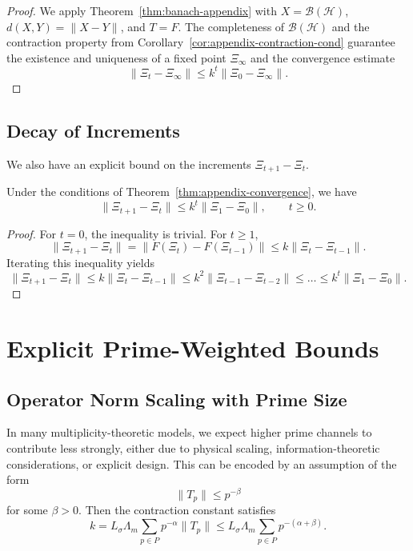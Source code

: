 \documentclass[12pt]{article}
\begin{document}
\begin{proof}
We apply Theorem~\ref{thm:banach-appendix} with \(X=\mathcal{B}(\mathcal{H})\), \(d(X,Y)=\|X-Y\|\), and \(T=F\). The completeness of \(\mathcal{B}(\mathcal{H})\) and the contraction property from Corollary~\ref{cor:appendix-contraction-cond} guarantee the existence and uniqueness of a fixed point \(\Xi_\infty\) and the convergence estimate
\[
  \|\Xi_t - \Xi_\infty\| \le k^t \|\Xi_0-\Xi_\infty\|.
\]
\end{proof}

\subsection{Decay of Increments}

We also have an explicit bound on the increments \(\Xi_{t+1}-\Xi_t\).

\begin{proposition}
\label{prop:appendix-increments}
Under the conditions of Theorem~\ref{thm:appendix-convergence}, we have
\[
  \|\Xi_{t+1}-\Xi_t\|
  \le
  k^t \|\Xi_1-\Xi_0\|,
  \qquad t\ge 0.
\]
\end{proposition}

\begin{proof}
For \(t=0\), the inequality is trivial. For \(t\ge 1\),
\[
  \|\Xi_{t+1}-\Xi_t\|
  = \|F(\Xi_t) - F(\Xi_{t-1})\|
  \le k \|\Xi_t-\Xi_{t-1}\|.
\]
Iterating this inequality yields
\[
  \|\Xi_{t+1}-\Xi_t\|
  \le k\|\Xi_t-\Xi_{t-1}\|
  \le k^2 \|\Xi_{t-1}-\Xi_{t-2}\|
  \le \dots
  \le k^t \|\Xi_1-\Xi_0\|.
\]
\end{proof}

\section{Explicit Prime-Weighted Bounds}
\label{sec:appendix-prime-weighted}

\subsection{Operator Norm Scaling with Prime Size}

In many multiplicity-theoretic models, we expect higher prime channels to contribute less strongly, either due to physical scaling, information-theoretic considerations, or explicit design. This can be encoded by an assumption of the form
\[
  \|T_p\| \le p^{-\beta}
\]
for some \(\beta>0\). Then the contraction constant satisfies
\[
  k = L_\sigma \Lambda_m \sum_{p\in P} p^{-\alpha}\|T_p\|
  \le
  L_\sigma \Lambda_m \sum_{p\in P} p^{-(\alpha+\beta)}.
\]
\end{document}
